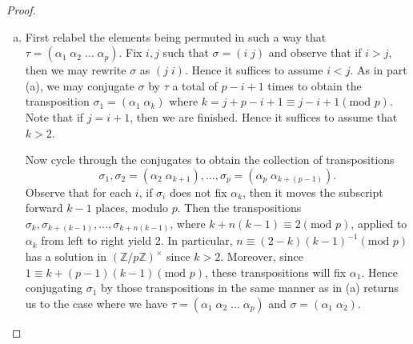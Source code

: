 \documentclass[10pt]{amsart}
\begin{document}
\begin{ex2}
\begin{proof}
\begin{enumerate}[(a)]
      It remains only to show that $\sigma$ and $\tau$ generate the transpositions of the form $\left(i\; i + j\right)$, where $1 \leq i \leq n$ and $1 < j \leq n - i$.
      These transpositions may be constructed in the following way.
      Let $i$ and $j$ be given.
      Consider the element $\tau_i = \left(i\; i+1\right)$ and observe that for all $1 < k \leq j$, $\tau_{i+k}(i) = i$.
      By associativity and the fact that transpositions are involutary, we may conjugate $\tau_i$ by the elements $\tau_{i+1}, \tau_{i+2}, \ldots, \tau_{i+j-1}$ in the following way:
      $$\tau_{i+j} \left( \ldots \left( \tau_{i+2} \left(\tau_{i+1} \tau_i\tau_{i+1} \right) \tau_{i+2}\right) \ldots \right) \tau_{i+j} = \left(i\; \tau_{i+j}\ldots\tau_{i+2}\tau_{i+1}\left(i + 1\right) \right).$$
      Now we observe that, by construction, $\tau_{i + k} = \left(i + k \;\; i+k+1\right)$ for $k = 1, \ldots, j$. 
      Hence $\tau_{i+j}\ldots\tau_{i+2}\tau_{i+1}\left(i + 1\right) = i+j$, thereby completing the construction.
      Therefore $S_n = \left<\left(1\; 2\right), \left(1\; 2\; 3\; \ldots\; n\right)\right>$. 
    \item
      First relabel the elements being permuted in such a way that $\tau = (\alpha_1\; \alpha_2\; \ldots\; \alpha_p)$.
      Fix $i,j$ such that $\sigma = (i\; j)$ and observe that if $i > j$, then we may rewrite $\sigma$ as $(j\; i)$.
      Hence it suffices to assume $i < j$.
      As in part (a), we may conjugate $\sigma$ by $\tau$ a total of $p - i + 1$ times to obtain the transposition $\sigma_1 = (\alpha_1\; \alpha_{k})$ where $k = j + p - i + 1 \equiv j - i + 1 (\text{mod } p)$.  Note that if $j = i+1$, then we are finished.  Hence it suffices to assume that $k > 2$.
      
      Now cycle through the conjugates to obtain the collection of transpositions $$\sigma_1, \sigma_2 = (\alpha_2\; \alpha_{k+1}), \ldots, \sigma_{p} = (\alpha_p\; \alpha_{k + (p-1)}).$$
      Observe that for each $i$, if $\sigma_i$ does not fix $\alpha_k$, then it moves the subscript forward $k - 1$ places, modulo $p$.
      Then the transpositions $\sigma_k, \sigma_{k + (k-1)}, \ldots, \sigma_{k + n(k-1)}$, where $k + n(k-1) \equiv 2 (\text{mod } p)$, applied to $\alpha_k$ from left to right yield 2.
      In particular, $n \equiv (2-k)(k-1)^{-1} (\text{mod } p)$ has a solution in $(\mathbb{Z}/p\mathbb{Z})^\times$ since $k > 2$.
      Moreover, since $1 \equiv k + (p-1)(k-1) (\text{mod } p)$, these transpositions will fix $\alpha_1$.
	  Hence conjugating $\sigma_1$ by those transpositions in the same manner as in (a) returns us to the case where we have $\tau = (\alpha_1\; \alpha_2\; \ldots\; \alpha_p)$ and $\sigma = (\alpha_1\; \alpha_2)$.
    \end{enumerate}
  \end{proof}
\end{ex2}
\end{document}
